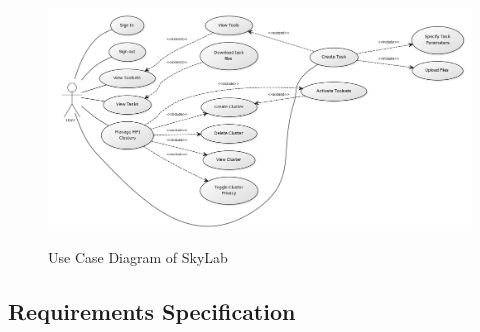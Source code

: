 \documentclass[journal]{./IEEE/IEEEtran}
\begin{document}


	
    \begin{figure}[ht]
      \centering
      \includegraphics[width=500px,height=250px]{./images/use_case_large.png}
      \caption{Use Case Diagram of SkyLab}\label{System Architecture}
    \end{figure}

    \subsection{Requirements Specification}
\end{document}
